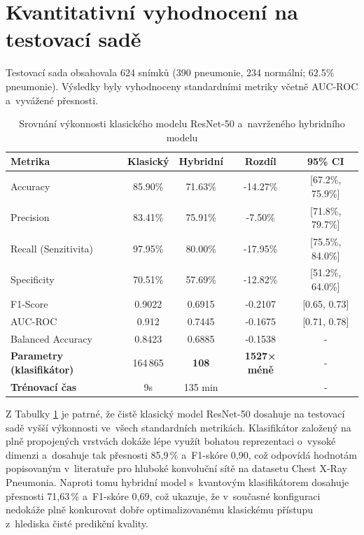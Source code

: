 \documentclass[12pt, a4paper]{report}
\begin{document}
\section{Kvantitativní vyhodnocení na testovací sadě}
Testovací sada obsahovala 624 snímků (390 pneumonie, 234 normální; 62.5\% pneumonie). Výsledky byly vyhodnoceny standardními metriky včetně AUC-ROC a~vyvážené přesnosti.

\begin{table}[h]
    \centering
    \caption{Srovnání výkonnosti klasického modelu ResNet-50 a~navrženého hybridního modelu}
    \label{tab:vysledky}
    \small
    \begin{tabular}{|l|c|c|c|c|}
        \hline
        \textbf{Metrika} & \textbf{Klasický} & \textbf{Hybridní} & \textbf{Rozdíl} & \textbf{95\% CI} \\
        \hline
        Accuracy & 85.90\% & 71.63\% & -14.27\% & [67.2\%, 75.9\%] \\
        Precision & 83.41\% & 75.91\% & -7.50\% & [71.8\%, 79.7\%] \\
        Recall (Senzitivita) & 97.95\% & 80.00\% & -17.95\% & [75.5\%, 84.0\%] \\
        Specificity & 70.51\% & 57.69\% & -12.82\% & [51.2\%, 64.0\%] \\
        F1-Score & 0.9022 & 0.6915 & -0.2107 & [0.65, 0.73] \\
        AUC-ROC & 0.912 & 0.7445 & -0.1675 & [0.71, 0.78] \\
        Balanced Accuracy & 0.8423 & 0.6885 & -0.1538 & - \\
        \hline
        \textbf{Parametry (klasifikátor)} & 164\,865 & \textbf{108} & \textbf{1527× méně} & - \\
        \textbf{Trénovací čas} & 9s & 135 min &  & - \\
        \hline
    \end{tabular}
\end{table}

Z Tabulky \ref{tab:vysledky} je patrné, že čistě klasický model ResNet-50 dosahuje na testovací sadě vyšší výkonnosti ve~všech standardních metrikách. Klasifikátor založený na plně propojených vrstvách dokáže lépe využít bohatou reprezentaci o~vysoké dimenzi a~dosahuje tak přesnosti 85{,}9\,\% a~F1-skóre 0{,}90, což odpovídá hodnotám popisovaným v~literatuře pro hluboké konvoluční sítě na datasetu Chest X-Ray Pneumonia.\cite{pneumonia_deep_learning_review} Naproti tomu hybridní model s~kvantovým klasifikátorem dosahuje přesnosti 71{,}63\,\% a~F1-skóre 0{,}69, což ukazuje, že v~současné konfiguraci nedokáže plně konkurovat dobře optimalizovanému klasickému přístupu z~hlediska čisté predikční kvality.\cite{pneumonia_detection_qml} 
\end{document}
